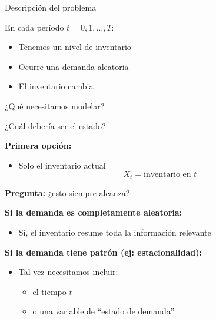 \documentclass{beamer}
\begin{document}
\begin{frame}{Descripción del problema}

En cada período \(t = 0,1,\dots,T\):

\begin{itemize}
\item Tenemos un nivel de inventario
\item Ocurre una demanda aleatoria
\item El inventario cambia
\end{itemize}

\pause

\begin{center}
\Large
¿Qué necesitamos modelar?
\end{center}

\end{frame}

\begin{frame}{¿Cuál debería ser el estado?}

\textbf{Primera opción:}
\begin{itemize}
\item Solo el inventario actual
\[
X_t = \text{inventario en } t
\]
\end{itemize}

\pause

\textbf{Pregunta:} ¿esto siempre alcanza?

\pause

\textbf{Si la demanda es completamente aleatoria:}
\begin{itemize}
\item Sí, el inventario resume toda la información relevante
\end{itemize}

\pause

\textbf{Si la demanda tiene patrón (ej: estacionalidad):}
\begin{itemize}
\item Tal vez necesitamos incluir:
\begin{itemize}
\item el tiempo \(t\)
\item o una variable de “estado de demanda”
\end{itemize}
\end{itemize}

\end{frame}
\end{document}
